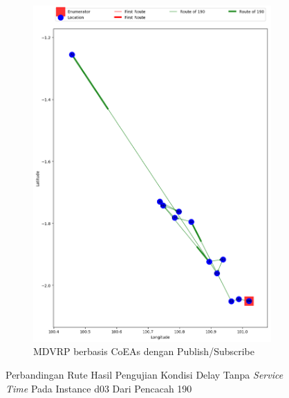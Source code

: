 \begin{figure}[H]\ContinuedFloat
	\centering
	\begin{subfigure}[t]{\textwidth}
		\centering
		\includegraphics[width=\textwidth]{Resources/Images/delayed_3/real_m15_n100_delayed_3_190_pubsub_coes}
		\caption{MDVRP berbasis CoEAs dengan Publish/Subscribe}
		\label{fig:real_m15_n100_delayed_3_190_pubsub_coes}
	\end{subfigure}
	\caption{Perbandingan Rute Hasil Pengujian Kondisi Delay Tanpa \textit{Service Time} Pada Instance d03 Dari Pencacah 190}
	\label{fig:real_m15_n100_delayed_3_190_contd}
\end{figure}


